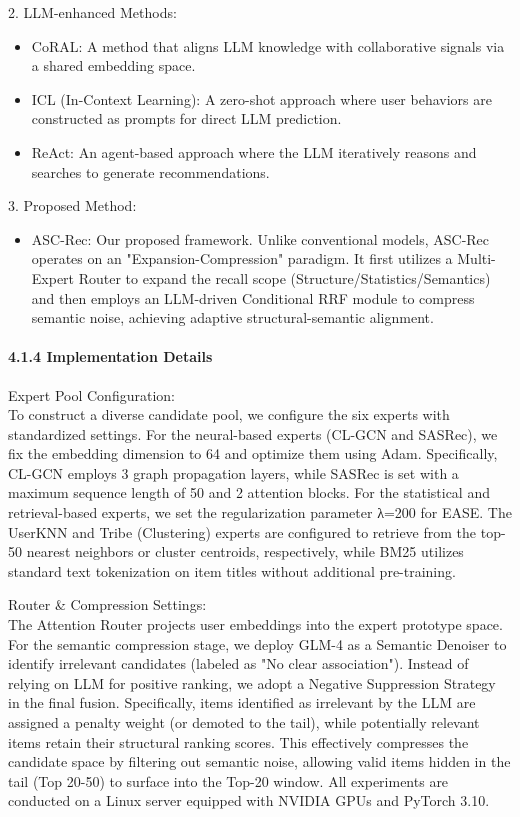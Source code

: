 \documentclass[]{article}
\let\oldparagraph\paragraph
\renewcommand{\paragraph}[1]{\oldparagraph{#1}\mbox{}}
\begin{document}
2. LLM-enhanced Methods:

\begin{itemize}
\item
  CoRAL: A method that aligns LLM knowledge with collaborative signals
  via a shared embedding space.
\item
  ICL (In-Context Learning): A zero-shot approach where user behaviors
  are constructed as prompts for direct LLM prediction.
\item
  ReAct: An agent-based approach where the LLM iteratively reasons and
  searches to generate recommendations.
\end{itemize}

3. Proposed Method:

\begin{itemize}
\item
  ASC-Rec: Our proposed framework. Unlike conventional models, ASC-Rec
  operates on an "Expansion-Compression" paradigm. It first utilizes a
  Multi-Expert Router to expand the recall scope
  (Structure/Statistics/Semantics) and then employs an LLM-driven
  Conditional RRF module to compress semantic noise, achieving adaptive
  structural-semantic alignment.
\end{itemize}

\hypertarget{implementation-details}{%
\paragraph{4.1.4 Implementation Details}\label{implementation-details}}

Expert Pool Configuration:\\
To construct a diverse candidate pool, we configure the six experts with
standardized settings. For the neural-based experts (CL-GCN and SASRec),
we fix the embedding dimension to 64 and optimize them using Adam.
Specifically, CL-GCN employs 3 graph propagation layers, while SASRec is
set with a maximum sequence length of 50 and 2 attention blocks. For the
statistical and retrieval-based experts, we set the regularization
parameter λ=200 for EASE. The UserKNN and Tribe (Clustering) experts are
configured to retrieve from the top-50 nearest neighbors or cluster
centroids, respectively, while BM25 utilizes standard text tokenization
on item titles without additional pre-training.

Router \& Compression Settings:\\
The Attention Router projects user embeddings into the expert prototype
space. For the semantic compression stage, we deploy GLM-4 as a Semantic
Denoiser to identify irrelevant candidates (labeled as "No clear
association"). Instead of relying on LLM for positive ranking, we adopt
a Negative Suppression Strategy in the final fusion. Specifically, items
identified as irrelevant by the LLM are assigned a penalty weight (or
demoted to the tail), while potentially relevant items retain their
structural ranking scores. This effectively compresses the candidate
space by filtering out semantic noise, allowing valid items hidden in
the tail (Top 20-50) to surface into the Top-20 window. All experiments
are conducted on a Linux server equipped with NVIDIA GPUs and PyTorch
3.10.
\end{document}
